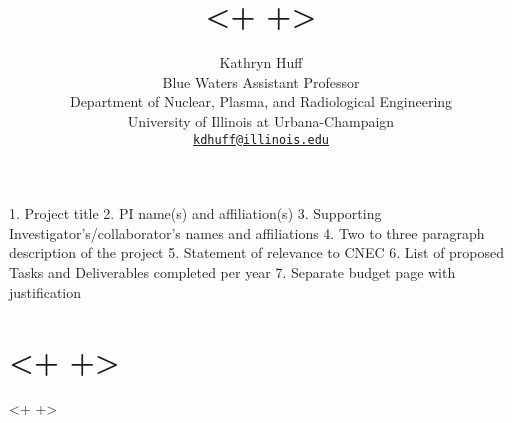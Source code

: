 \documentclass[letterpaper]{article}
\author{Kathryn Huff\\
        Blue Waters Assistant Professor\\
        Department of Nuclear, Plasma, and Radiological Engineering\\
        University of Illinois at Urbana-Champaign\\
         \href{mailto:kdhuff@illinois.edu}{\texttt{kdhuff@illinois.edu}}}
\date{}
\title{<+  +>}
\begin{document}
\maketitle


1. Project title
2. PI name(s) and affiliation(s)
3. Supporting Investigator’s/collaborator’s names and affiliations
4. Two to three paragraph description of the project
5. Statement of relevance to CNEC
6. List of proposed Tasks and Deliverables completed per year
7. Separate budget page with justification
\section{<+  +>}<+  +>

\pagebreak


\end{document}
